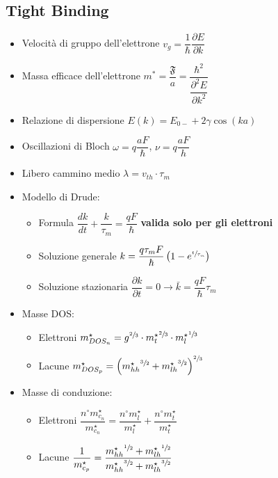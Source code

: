 \documentclass[9pt]{extarticle}
\begin{document}
\subsection{Tight Binding}
\begin{itemize}
  \item Velocità di gruppo dell'elettrone \( v_g = \dfrac{1}{\hbar} \dfrac{\partial E}{\partial k} \)
  \item Massa efficace dell'elettrone \( m ^ \ast = \dfrac{ \mathfrak{F} }{a} = \dfrac{\hbar ^ 2}{\dfrac{\partial ^ 2 E}{\partial k ^ 2}} \)
  \item Relazione di dispersione \( E(k) = E_{0-} + 2 \gamma \cos(ka) \)
  \item Oscillazioni di Bloch \( \omega = q \dfrac{a F}{\hbar} \), \( \nu = q \dfrac{a F}{h} \)
  \item Libero cammino medio \( \lambda = v_{th} \cdot \tau_m \)
  \item Modello di Drude:
        \begin{itemize}
          \item Formula \( \dfrac{dk}{dt} + \dfrac{k}{\tau_m}= \dfrac{q F}{\hbar} \) \textbf{valida solo per gli elettroni}
          \item Soluzione generale \( k = \dfrac{q \tau_m F}{\hbar} \left( 1 - e^{\sfrac{t}{\tau_m}} \right) \)
          \item Soluzione stazionaria \( \dfrac{\partial k}{\partial t} = 0 \rightarrow \bar{k} = \dfrac{q F}{\hbar} \tau_m \)
        \end{itemize}
  \item Masse DOS:
        \begin{itemize}
          \item Elettroni \( m^{\star}_{DOS_n} = g ^ {\sfrac{2}{3}} \cdot {m^\star_t} ^ {\sfrac{2}{3}} \cdot {m^\star_l} ^ {\sfrac{1}{3}}  \)
          \item Lacune \( m^{\star}_{DOS_p} = \left( {m_{hh}^{\star}} ^ {\sfrac{3}{2}} + {m_{lh}^{\star}} ^ {\sfrac{3}{2}} \right) ^ {\sfrac{2}{3}} \)
        \end{itemize}
  \item Masse di conduzione:
        \begin{itemize}
          \item Elettroni \( \dfrac{n^{\circ} m^\star_{c_n}}{m^\star_{c_n}} = \dfrac{n^{\circ} m_l^\star}{m_l^\star} + \dfrac{n^{\circ} m_t^\star}{m_t^\star} \)
          \item Lacune \( \dfrac{1}{m^\star_{c_p}} = \dfrac{{m^\star_{hh}} ^ {\sfrac{1}{2}} + {m^\star_{lh}} ^ {\sfrac{1}{2}} }{{m^\star_{hh}} ^ {\sfrac{3}{2}} + {m^\star_{lh}} ^ {\sfrac{3}{2}} } \)
        \end{itemize}
\end{itemize}
\end{document}
